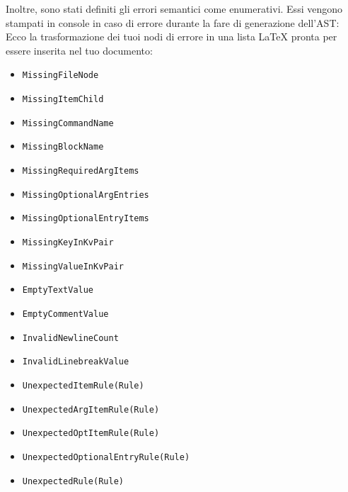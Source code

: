 \documentclass{article}
\begin{document}
    Inoltre, sono stati definiti gli errori semantici come enumerativi. Essi vengono stampati in console in caso di errore durante la fare di generazione dell'AST:
    Ecco la trasformazione dei tuoi nodi di errore in una lista LaTeX pronta per essere inserita nel tuo documento:

    \begin{itemize}
        \item \texttt{MissingFileNode}
        \item \texttt{MissingItemChild}
        \item \texttt{MissingCommandName}
        \item \texttt{MissingBlockName}
        \item \texttt{MissingRequiredArgItems}
        \item \texttt{MissingOptionalArgEntries}
        \item \texttt{MissingOptionalEntryItems}
        \item \texttt{MissingKeyInKvPair}
        \item \texttt{MissingValueInKvPair}
        \item \texttt{EmptyTextValue}
        \item \texttt{EmptyCommentValue}
        \item \texttt{InvalidNewlineCount}
        \item \texttt{InvalidLinebreakValue}
        \item \texttt{UnexpectedItemRule(Rule)}
        \item \texttt{UnexpectedArgItemRule(Rule)}
        \item \texttt{UnexpectedOptItemRule(Rule)}
        \item \texttt{UnexpectedOptionalEntryRule(Rule)}
        \item \texttt{UnexpectedRule(Rule)}
    \end{itemize}
\end{document}
